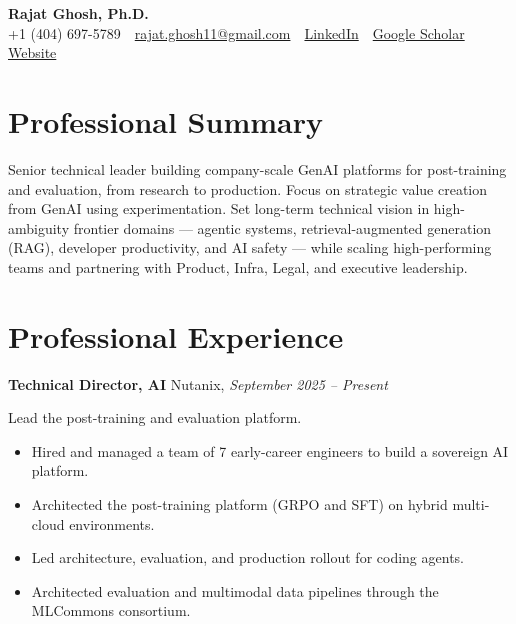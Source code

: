 \documentclass[10.5pt]{article}
\newcommand{\role}[3]{\textbf{#1} \hfill #2, \textit{#3}\par}
\newcommand{\scope}[1]{\vspace{1pt}#1\par}
\begin{document}
\begin{center}
  {\LARGE\bfseries Rajat Ghosh, Ph.D.}\\[4pt]
  {\color{gray}+1 (404) 697-5789 \,\textperiodcentered\, \href{mailto:rajat.ghosh11@gmail.com}{rajat.ghosh11@gmail.com} \,\textperiodcentered\, \href{https://linkedin.com/in/i-am-rajat}{LinkedIn} \,\textperiodcentered\, \href{https://scholar.google.com/citations?user=rhXtLnQAAAAJ&hl=en&oi=ao}{Google Scholar} \,\textperiodcentered\, \href{https://rajatghosh.me/}{Website}}
\end{center}

\section{Professional Summary}
Senior technical leader building company-scale GenAI platforms for post-training and evaluation, from research to production. Focus on strategic value creation from GenAI using experimentation. Set long-term technical vision in high-ambiguity frontier domains --- agentic systems, retrieval-augmented generation (RAG), developer productivity, and AI safety --- while scaling high-performing teams and partnering with Product, Infra, Legal, and executive leadership.

\section{Professional Experience}

\role{Technical Director, AI}{Nutanix}{September 2025 -- Present}
\scope{Lead the post-training and evaluation platform.}
\begin{itemize}
  \item Hired and managed a team of 7 early-career engineers to build a sovereign AI platform.
  \item Architected the post-training platform (GRPO and SFT) on hybrid multi-cloud environments.
  \item Led architecture, evaluation, and production rollout for coding agents.
  \item Architected evaluation and multimodal data pipelines through the MLCommons consortium.
\end{itemize}
\end{document}
